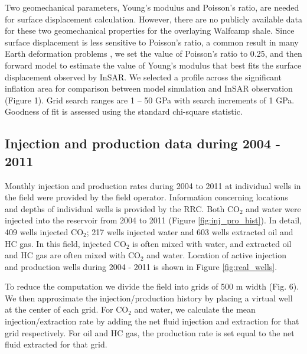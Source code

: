 Two geomechanical parameters, Young’s modulus and Poisson’s ratio, are needed for surface displacement calculation.  However, there are no publicly available data for these two geomechanical properties for the overlaying Walfcamp shale.  Since surface displacement is less sensitive to Poisson’s ratio, a common result in many Earth deformation problems \cite[e.g.,][]{bevis2005seasonal}, we set the value of Poisson’s ratio to 0.25, and then forward model to estimate the value of Young’s modulus that best fits the surface displacement observed by InSAR. We selected a profile across the significant inflation area for comparison between model simulation and InSAR observation (Figure 1).  Grid search ranges are 1 – 50 GPa with search increments of 1 GPa.  Goodness of fit is assessed using the standard chi-square statistic.

\subsection{Injection and production data during 2004 - 2011}
Monthly injection and production rates during 2004 to 2011 at individual wells in the field were provided by the field operator. Information concerning locations and depths of individual wells is provided by the RRC.  Both CO$_{2}$ and water were injected into the reservoir from 2004 to 2011 (Figure \ref{fig:inj_pro_hist}).  In detail, 409 wells injected CO$_{2}$; 217 wells injected water and 603 wells extracted oil and HC gas.  In this field, injected CO$_{2}$ is often mixed with water, and extracted oil and HC gas are often mixed with CO$_{2}$ and water.  Location of active injection and production wells during 2004 - 2011 is shown in Figure \ref{fig:real_wells}.  

To reduce the computation we divide the field into grids of 500 m width (Fig. 6). We then approximate the injection/production history by placing a virtual well at the center of each grid.  For CO$_{2}$ and water, we calculate the mean injection/extraction rate by adding the net fluid injection and extraction for that grid respectively.  For oil and HC gas, the production rate is set equal to the net fluid extracted for that grid. 

